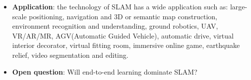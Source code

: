 \documentclass[journal,transmag]{IEEEtran}
\begin{document}
\begin{itemize}
    \item \textbf{Application}: the technology of SLAM has a wide application such as: large-scale positioning, navigation and 3D or semantic map construction, environment recognition and understanding,  ground robotics, UAV, VR/AR/MR, AGV(Automatic Guided Vehicle), automatic drive, virtual interior decorator, virtual fitting room, immersive online game, earthquake relief, video segmentation and editing.
    \item \textbf{Open question}: Will end-to-end learning dominate SLAM?
\end{itemize}


\ifCLASSOPTIONcaptionsoff
  \newpage
\fi


\end{document}

